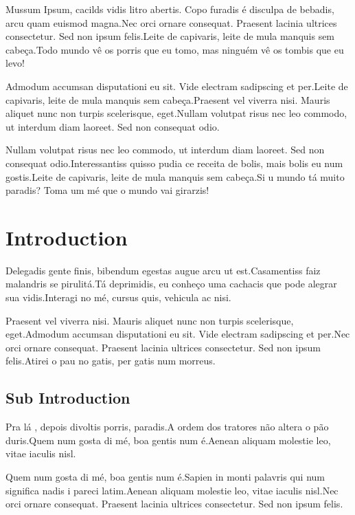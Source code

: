 \documentclass[english]{cenarticle}
\author{
  \authorinfo[0000-0002-1825-0097]{Josiah Carberry}{I}, 
  \authorinfo[0000-0002-1825-0097]{Maryln Tall}{II},
  \authorinfo{Dwain Gooslin}{I}
}
\affil{ 
  \affiliation{I}{Brown University, USA}
  \affiliation{II}{University of Oxford, UK}
}
\begin{document}
  \coverpage

  Mussum Ipsum, cacilds vidis litro abertis. Copo furadis é disculpa de bebadis, arcu quam euismod magna.Nec orci ornare consequat. Praesent lacinia ultrices consectetur. Sed non ipsum felis.Leite de capivaris, leite de mula manquis sem cabeça.Todo mundo vê os porris que eu tomo, mas ninguém vê os tombis que eu levo!\par
  
  Admodum accumsan disputationi eu sit. Vide electram sadipscing et per.Leite de capivaris, leite de mula manquis sem cabeça.Praesent vel viverra nisi. Mauris aliquet nunc non turpis scelerisque, eget.Nullam volutpat risus nec leo commodo, ut interdum diam laoreet. Sed non consequat odio.
  
  Nullam volutpat risus nec leo commodo, ut interdum diam laoreet. Sed non consequat odio.Interessantiss quisso pudia ce receita de bolis, mais bolis eu num gostis.Leite de capivaris, leite de mula manquis sem cabeça.Si u mundo tá muito paradis? Toma um mé que o mundo vai girarzis!


  \section{Introduction}

  Delegadis gente finis, bibendum egestas augue arcu ut est.Casamentiss faiz malandris se pirulitá.Tá deprimidis, eu conheço uma cachacis que pode alegrar sua vidis.Interagi no mé, cursus quis, vehicula ac nisi.
  
  Praesent vel viverra nisi. Mauris aliquet nunc non turpis scelerisque, eget.Admodum accumsan disputationi eu sit. Vide electram sadipscing et per.Nec orci ornare consequat. Praesent lacinia ultrices consectetur. Sed non ipsum felis.Atirei o pau no gatis, per gatis num morreus.
  
  \subsection{Sub Introduction}

  Pra lá , depois divoltis porris, paradis.A ordem dos tratores não altera o pão duris.Quem num gosta di mé, boa gentis num é.Aenean aliquam molestie leo, vitae iaculis nisl.
  
  Quem num gosta di mé, boa gentis num é.Sapien in monti palavris qui num significa nadis i pareci latim.Aenean aliquam molestie leo, vitae iaculis nisl.Nec orci ornare consequat. Praesent lacinia ultrices consectetur. Sed non ipsum felis.
  
\end{document}
